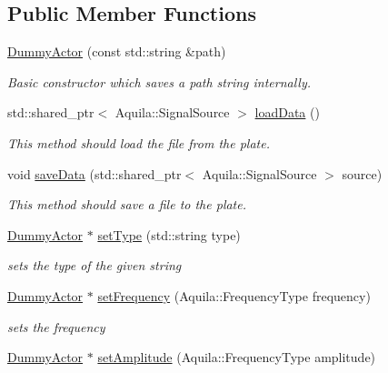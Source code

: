 \subsection*{Public Member Functions}
\begin{DoxyCompactItemize}
\item 
\hyperlink{classuanc_1_1util_1_1_dummy_actor_abb98480739b7b401d41ccc68c8cba8a1}{Dummy\+Actor} (const std\+::string \&path)
\begin{DoxyCompactList}\small\item\em Basic constructor which saves a path string internally. \end{DoxyCompactList}\item 
std\+::shared\+\_\+ptr$<$ Aquila\+::\+Signal\+Source $>$ \hyperlink{classuanc_1_1util_1_1_dummy_actor_ae2912157674c282f5436f27ddbfcf8cc}{load\+Data} ()
\begin{DoxyCompactList}\small\item\em This method should load the file from the plate. \end{DoxyCompactList}\item 
void \hyperlink{classuanc_1_1util_1_1_dummy_actor_a321ba3ff6c3718d56edb6efe961f8230}{save\+Data} (std\+::shared\+\_\+ptr$<$ Aquila\+::\+Signal\+Source $>$ source)
\begin{DoxyCompactList}\small\item\em This method should save a file to the plate. \end{DoxyCompactList}\item 
\hyperlink{classuanc_1_1util_1_1_dummy_actor}{Dummy\+Actor} $\ast$ \hyperlink{classuanc_1_1util_1_1_dummy_actor_a5727b1ff300c340abd9216287592f9d9}{set\+Type} (std\+::string type)
\begin{DoxyCompactList}\small\item\em sets the type of the given string \end{DoxyCompactList}\item 
\hyperlink{classuanc_1_1util_1_1_dummy_actor}{Dummy\+Actor} $\ast$ \hyperlink{classuanc_1_1util_1_1_dummy_actor_a05d45731dce558047fff26bebd55e8ed}{set\+Frequency} (Aquila\+::\+Frequency\+Type frequency)
\begin{DoxyCompactList}\small\item\em sets the frequency \end{DoxyCompactList}\item 
\hyperlink{classuanc_1_1util_1_1_dummy_actor}{Dummy\+Actor} $\ast$ \hyperlink{classuanc_1_1util_1_1_dummy_actor_a3e14c7739566b336c5c60b187d033f24}{set\+Amplitude} (Aquila\+::\+Frequency\+Type amplitude)

\end{DoxyCompactItemize}
